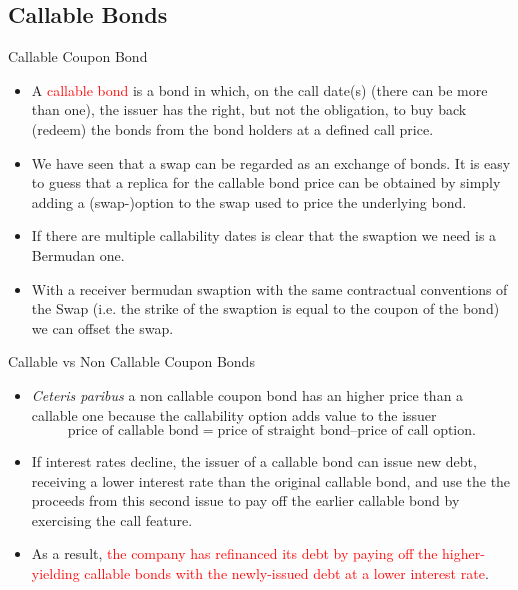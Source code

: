 \documentclass{beamer}
\begin{document}
\subsection{Callable Bonds}
\begin{frame}{Callable Coupon Bond}
\begin{itemize}
	\item<1-> A \textcolor{red}{callable bond} is a bond in which, on the call date(s) (there can be more than one), the issuer has the right, but not the obligation, to buy back (redeem) the bonds from the bond holders at a defined call price.
	\item<2-> We have seen that a swap can be regarded as an exchange of bonds. It is easy to guess that a replica for the callable bond price can be obtained by simply adding a (swap-)option to the swap used to price the underlying bond.
	\item<3-> If there are multiple callability dates is clear that the swaption we need is a Bermudan one.
	\item<4-> With a receiver bermudan swaption with the same contractual conventions of the Swap (i.e. the strike of the swaption is equal to the coupon of the bond) we can offset the swap. %
\end{itemize}
\end{frame}

\begin{frame}{Callable vs Non Callable Coupon Bonds}
\begin{itemize}
	\item<1-> \emph{Ceteris paribus} a non callable coupon bond has an higher price than a callable one because the callability option adds value to the issuer
	\begin{equation*}
		\text{price of callable bond} = \text{price of straight bond} – \text{price of call option}.
	\end{equation*}
	\item<2-> If interest rates decline, the issuer of a callable bond can issue new debt, receiving a lower interest rate than the original callable bond, and use the the proceeds from this second issue to pay off the earlier callable bond by exercising the call feature.
	\item<3-> As a result, \textcolor{red}{the company has refinanced its debt by paying off the higher-yielding callable bonds with the newly-issued debt at a lower interest rate}.		
\end{itemize}
\end{frame}
\end{document}
